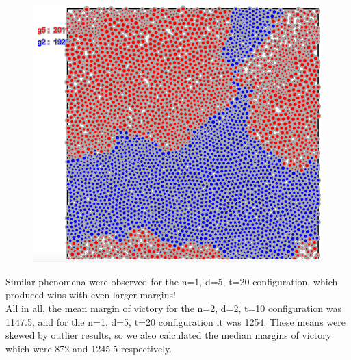 \begin{figure}[h]
\center
\includegraphics[scale=0.3]{tourn8.png}
\caption{}
\label{fig:tourn8}
\end{figure}
Similar phenomena were observed for the n=1, d=5, t=20 configuration, which produced wins with even larger margins!\\


All in all, the mean margin of victory for the n=2, d=2, t=10 configuration was 1147.5, and for the n=1, d=5, t=20 configuration it was 1254. These means were skewed by outlier results, so we also calculated the median margins of victory which were 872 and 1245.5 respectively.\\

